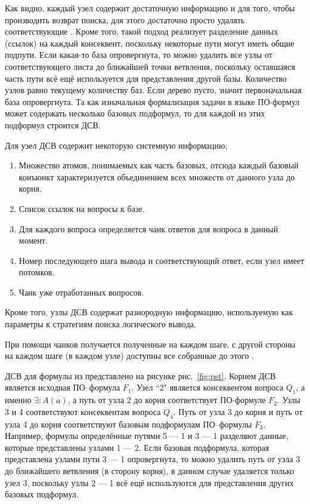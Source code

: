 Как видно, каждый узел содержит достаточную информацию и для того, чтобы производить возврат поиска, для этого достаточно просто удалять соответствующие . Кроме того, такой подход реализует разделение данных (ссылок) на каждый консеквент, поскольку некоторые пути могут иметь общие подпути. Если какая-то база опровергнута, то можно удалить все узлы от соответствующего листа до ближайшей точки ветвления, поскольку оставшаяся часть пути всё ещё используется для представления другой базы. Количество  узлов равно текущему количеству баз. Если дерево пусто, значит первоначальная база опровергнута. Та как изначальная формализация задачи в языке ПО-формул может содержать несколько базовых подформул, то для каждой из этих подформул строится  ДСВ.

Для  узел ДСВ содержит некоторую системную информацию:
\begin{enumerate}
\item Множество атомов, понимаемых как часть базовых, отсюда каждый базовый конъюнкт характеризуется объединением всех множеств от данного узла до корня.
\item Список ссылок на вопросы к базе.
\item Для каждого вопроса определяется чанк ответов для вопроса в данный момент.
\item Номер последующего шага вывода и соответствующий ответ, если узел имеет потомков.
\item Чанк уже отработанных вопросов.
\end{enumerate}
Кроме того, узлы ДСВ содержат разнородную информацию, используемую как параметры к стратегиям поиска логического вывода.

При помощи чанков получается   полученные на каждом шаге, с другой стороны на каждом шаге (в каждом узле) доступны все собранные до этого .

ДСВ для формулы из  представлено на рисунке рис.~\ref{fig:pst}. Корнем ДСВ является исходная ПО--формула $F_1$. Узел ``2" является консеквентом вопроса $Q_1$, а именно $\exists\colon A(a)$, а путь от узла 2 до корня соответствует ПО-формуле $F_2$. Узлы 3 и 4 соответствуют консеквентам вопроса $Q_4$. Путь от узла 3 до корня и путь от узла 4 до корня соответствуют базовым подформулам ПО--формулы $F_3$. Например, формулы определённые путями 5 --- 1 и 3 --- 1 разделяют данные, которые представлены узлами 1 --- 2. Если базовая подформула, которая представлена узлами пути 3 --- 1 опровергнута, то можно удалить путь от узла 3 до ближайшего ветвления (в сторону корня), в данном случае удаляется только узел 3, поскольку узлы 2 --- 1 всё ещё используются для представления других базовых подформул.

